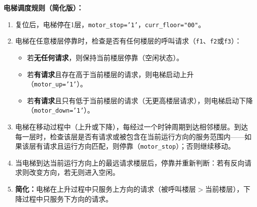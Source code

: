 \textbf{电梯调度规则（简化版）：}
\begin{enumerate}[label=(\arabic*)]
  \item 复位后，电梯停在1层，\texttt{motor\_stop='1'}，\texttt{curr\_floor="00"}。
  \item 电梯在任意楼层停靠时，检查是否有任何楼层的呼叫请求（\texttt{f1}、\texttt{f2}或\texttt{f3}）：
  \begin{itemize}
    \item 若\textbf{无任何请求}，则保持当前楼层停靠（空闲状态）。
    \item 若\textbf{有请求}且存在高于当前楼层的请求，则电梯启动上升（\texttt{motor\_up='1'}）。
    \item 若\textbf{有请求}且只有低于当前楼层的请求（无更高楼层请求），则电梯启动下降（\texttt{motor\_down='1'}）。
  \end{itemize}
  \item 电梯在移动过程中（上升或下降），每经过一个时钟周期到达相邻楼层。到达每一层时，检查该层是否有请求或被包含在当前运行方向的服务范围内——如果该层有请求且运行方向匹配，则停靠（\texttt{motor\_stop}）；否则继续移动。
  \item 当电梯到达当前运行方向上的最远请求楼层后，停靠并重新判断：若有反向请求则改变方向，若无则进入空闲。
  \item \textbf{简化：}电梯在上升过程中只服务上方向的请求（被呼叫楼层$>$当前楼层），下降过程中只服务下方向的请求。
\end{enumerate}

\vspace{0.3cm}

